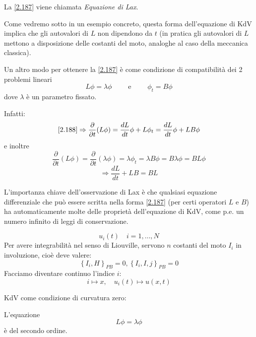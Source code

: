 \documentclass[a4paper,11pt]{report}
\begin{document}
\medskip

La \eqref{2.187} viene chiamata \emph{Equazione di Lax}.

Come vedremo sotto in un esempio concreto, questa forma dell'equazione di KdV implica che gli autovalori di $L$ non dipendono da $t$ (in pratica gli autovalori di $L$ mettono a disposizione delle costanti del moto, analoghe al caso della meccanica classica). 

Un altro modo per ottenere la \eqref{2.187} \`e come condizione di compatibilit\`a dei 2 problemi lineari
\begin{equation}
L\phi =\lambda \phi \qquad \text{ e } \qquad \phi_t = B\phi
\label{2.188}
\end{equation}
dove $\lambda$ è un parametro fissato.

Infatti: 
\[
\eqref{2.188}\Rightarrow \frac{\partial}{\partial t}(L\phi) = \frac{dL}{dt}\phi + L\phi_t = \frac{dL}{dt}\phi + LB\phi
\]
e inoltre
\[
\frac{\partial}{\partial t}(L\phi) = \frac{\partial}{\partial t}(\lambda \phi) = \lambda \phi_t = \lambda B \phi = B\lambda\phi = BL\phi
\]
\[
\Rightarrow \frac{dL}{dt} + LB = BL
\]

L'importanza chiave dell'osservazione di Lax \`e che qualsiasi equazione differenziale che pu\`o essere scritta nella forma \eqref{2.187} (per certi operatori $L$ e $B$) ha automaticamente molte delle propriet\`a dell'equazione di KdV, come p.e. un numero infinito di leggi di conservazione.

\medskip

\[
u_i(t) \quad i=1,\dots,N
\]
Per avere integrabilit\`a nel senso di Liouville, servono $n$ costanti del moto $I_i$ in involuzione, cio\`e deve valere:
\[
\left\{I_i,H \right\}_{PB}=0, \left\{I_i,I,j\right\}_{PB}=0
\]
Facciamo diventare continuo l'indice $i$:
\[
i\mapsto x,\quad u_i(t)\mapsto u(x,t)
\]

\medskip

KdV come condizione di curvatura zero:

L'equazione
\[
L\phi = \lambda \phi
\]
\`e del secondo ordine. 
\end{document}
